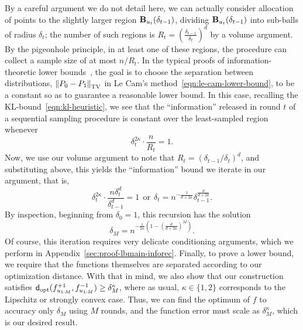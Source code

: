 By a careful argument we do not detail here, we can actually consider
allocation of points to the slightly larger region
$\mathbf{B}_{u_t}({\delta_{t-1}})$, dividing $\mathbf{B}_{u_t}({\delta_{t-1}})$ into
sub-balls of radius $\delta_t$; the number of such regions is $R_t =
(\frac{\delta_{t-1}}{\delta_t})^d$ by a volume argument.  By the pigeonhole
principle, in at least one of these regions, the procedure can collect a
sample size of at most $n / R_t$. In the typical proofs of
information-theoretic lower
bounds~\citep{Tsybakov09,AgarwalBaRaWa12,Duchi17}, the goal is to choose the
separation between distributions, $\tvnorm{P_0 - P_1}$ in Le Cam's
method~\eqref{eqn:le-cam-lower-bound}, to be a constant so as to guarantee a
reasonable lower bound. In this case, recalling the
KL-bound~\eqref{eqn:kl-heuristic}, we see that the ``information'' released
in round $t$ of a sequential sampling procedure is constant over the
least-sampled region whenever
\begin{equation*}
  \delta_t^{2\kappa} \cdot \frac{n}{R_t} = 1.
\end{equation*}
Now, we use our volume argument to note that $R_t = (\delta_{t-1} /
\delta_t)^d$, and substituting above, this yields the ``information'' bound
we iterate in our argument, that is,
\begin{equation*}
  \delta_t^{2\kappa} \cdot \frac{n \delta_t^d}{\delta_{t-1}^d} = 1
  ~~ \mbox{or} ~~
  \delta_t = n^{-\frac{1}{d+2\kappa}} \delta_{t-1}^\frac{d}{d + 2k}.
\end{equation*}
By inspection, beginning from $\delta_0 = 1$, this recursion has the
solution
\begin{equation}
  \delta_M = n^{-\frac{1}{2\kappa} \left(1 - \left(\frac{d}{d + 2\kappa}\right)^M
    \right)}.
  \label{eqn:heuristic-recursion}
\end{equation}
Of course, this iteration requires very delicate conditioning arguments,
which we perform in Appendix~\ref{sec:proof-lbmain-inforec}.  Finally, to
prove a lower bound, we require that the functions themselves are separated
according to our optimization distance.  With that in mind, we also show
that our construction satisfies $\fndist(f^{+1}_{u_{1:M}}, f^{-1}_{u_{1:M}})
\ge \delta_M^\kappa$, where as usual, $\kappa \in \{1, 2\}$ corresponds to
the Lipschitz or strongly convex case. Thus, we can find the optimum of $f$
to accuracy only $\delta_M$ using $M$ rounds, and the function error must
scale as $\delta_M^\kappa$, which is our desired result.


